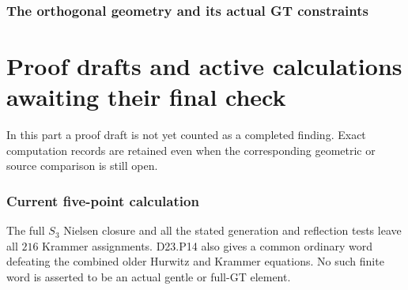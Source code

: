 \documentclass[11pt]{article}
\begin{document}
\section{The orthogonal geometry and its actual GT constraints}








































\part{Proof drafts and active calculations awaiting their final check}
In this part a proof draft is not yet counted as a completed
finding.  Exact computation records are retained even when the
corresponding geometric or source comparison is still open.
\section{Current five-point calculation}
The full $S_3$ Nielsen closure and all the stated generation and
reflection tests leave all $216$ Krammer assignments. D23.P14
also gives a common ordinary word defeating the combined older
Hurwitz and Krammer equations. No such finite word is asserted
to be an actual gentle or full-GT element.
\end{document}
